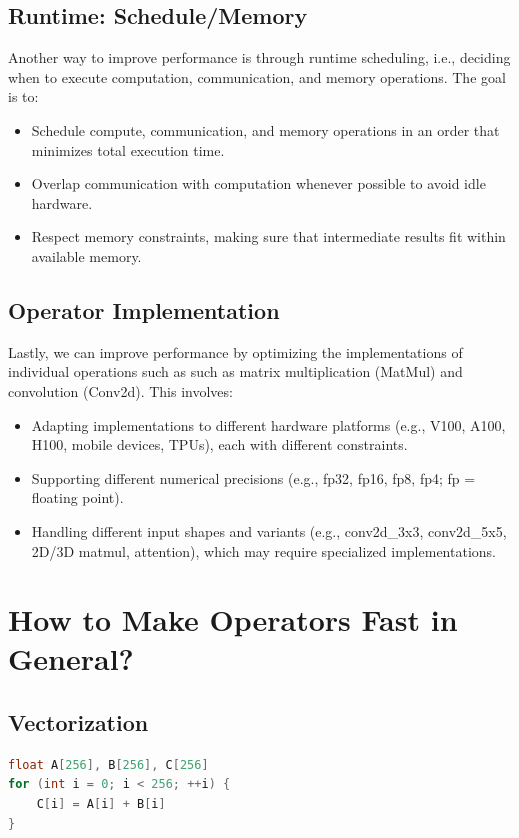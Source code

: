 \documentclass[twoside]{article}
\begin{document}
\subsection{Runtime: Schedule/Memory}
Another way to improve performance is through runtime scheduling, i.e., deciding when to execute 
computation, communication, and memory operations. The goal is to:
\begin{itemize}
    \item Schedule compute, communication, and memory operations in an order that minimizes total execution time.
    \item Overlap communication with computation whenever possible to avoid idle hardware.
    \item Respect memory constraints, making sure that intermediate results fit within available memory.
\end{itemize}


\subsection{Operator Implementation}
Lastly, we can improve performance by optimizing the implementations of individual operations such as such as matrix multiplication 
(MatMul) and convolution (Conv2d). This involves:
\begin{itemize}
    \item Adapting implementations to different hardware platforms (e.g., V100, A100, H100, mobile devices, TPUs), each with different constraints.
    \item Supporting different numerical precisions (e.g., fp32, fp16, fp8, fp4; fp = floating point).
    \item Handling different input shapes and variants (e.g., conv2d\_3x3, conv2d\_5x5, 2D/3D matmul, attention), which may require specialized implementations.
\end{itemize}

\section{How to Make Operators Fast in General?}
\subsection{Vectorization}
\begin{lstlisting}[language=C++, title={Unvectorized}]
float A[256], B[256], C[256]
for (int i = 0; i < 256; ++i) {
    C[i] = A[i] + B[i]
}
\end{lstlisting}
\end{document}
